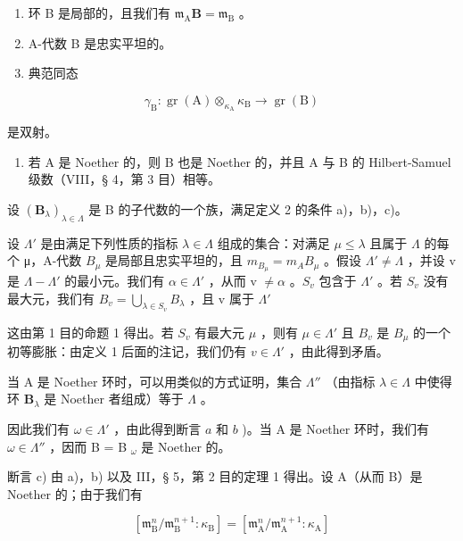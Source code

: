 \begin{enumerate}
\def\labelenumi{\alph{enumi})}
\item
  环 B 是局部的，且我们有 \(\mathfrak{m}_{\mathrm{A}}\mathbf{B} = \mathfrak{m}_{\mathrm{B}}\) 。
\item
  A-代数 B 是忠实平坦的。
\item
  典范同态
\end{enumerate}

\[
\gamma_ {\mathrm{B}}: \operatorname{gr} (\mathrm{A}) \otimes_ {\kappa_ {\mathrm{A}}} \kappa_ {\mathrm{B}} \rightarrow \operatorname{gr} (\mathrm{B})
\]

是双射。

\begin{enumerate}
\def\labelenumi{\alph{enumi})}
\setcounter{enumi}{3}
\tightlist
\item
  若 A 是 Noether 的，则 B 也是 Noether 的，并且 A 与 B 的 Hilbert-Samuel 级数（VIII，§ 4，第 3 目）相等。
\end{enumerate}

设 \((\mathbf{B}_{\lambda})_{\lambda\in\Lambda}\) 是 B 的子代数的一个族，满足定义 2 的条件 a)，b)，c)。

设 \(\Lambda'\) 是由满足下列性质的指标 \(\lambda \in \Lambda\) 组成的集合：对满足 \(\mu \leqslant \lambda\) 且属于 \(\Lambda\) 的每个 μ，A-代数 \(B_{\mu}\) 是局部且忠实平坦的，且 \(m_{B_{\mu}} = m_A B_{\mu}\) 。假设 \(\Lambda' \neq \Lambda\) ，并设 v 是 \(\Lambda - \Lambda'\) 的最小元。我们有 \(\alpha \in \Lambda'\) ，从而 v \(\neq \alpha\) 。\(S_{v}\) 包含于 \(\Lambda'\) 。若 \(S_{v}\) 没有最大元，我们有 \(B_{v} = \bigcup_{\lambda \in S_{v}} B_{\lambda}\) ，且 v 属于 \(\Lambda'\)

  这由第 1 目的命题 1 得出。若 \(S_v\) 有最大元 \(\mu\) ，则有 \(\mu \in \Lambda'\) 且 \(B_v\) 是 \(B_\mu\) 的一个初等膨胀：由定义 1 后面的注记，我们仍有 \(v \in \Lambda'\) ，由此得到矛盾。

当 A 是 Noether 环时，可以用类似的方式证明，集合 \(\Lambda''\) （由指标 \(\lambda \in \Lambda\) 中使得环 \(\mathbf{B}_{\lambda}\) 是 Noether 者组成）等于 \(\Lambda\) 。

因此我们有 \(\omega\in\Lambda'\) ，由此得到断言 \(a\) 和 \(b\) )。当 A 是 Noether 环时，我们有 \(\omega\in\Lambda''\) ，因而 B = B \(_{\omega}\) 是 Noether 的。

断言 c) 由 a)，b) 以及 III，§ 5，第 2 目的定理 1 得出。设 A（从而 B）是 Noether 的；由于我们有

\[
\left[ \mathfrak {m} _ {\mathrm{B}} ^ {n} / \mathfrak {m} _ {\mathrm{B}} ^ {n + 1}: \kappa_ {\mathrm{B}} \right] = \left[ \mathfrak {m} _ {\mathrm{A}} ^ {n} / \mathfrak {m} _ {\mathrm{A}} ^ {n + 1}: \kappa_ {\mathrm{A}} \right]
\]

